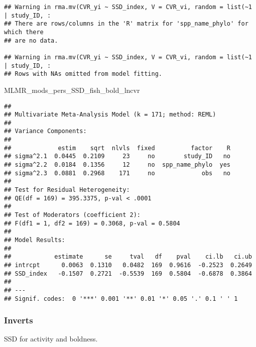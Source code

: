\documentclass[]{article}
\newenvironment{Shaded}{\begin{snugshade}}{\end{snugshade}}
\newcommand{\NormalTok}[1]{#1}
\begin{document}
\begin{verbatim}
## Warning in rma.mv(CVR_yi ~ SSD_index, V = CVR_vi, random = list(~1 | study_ID, :
## There are rows/columns in the 'R' matrix for 'spp_name_phylo' for which there
## are no data.

## Warning in rma.mv(CVR_yi ~ SSD_index, V = CVR_vi, random = list(~1 | study_ID, :
## Rows with NAs omitted from model fitting.
\end{verbatim}

\begin{Shaded}
\begin{Highlighting}[]
\NormalTok{    MLMR_mods_pers_SSD_fish_bold_lncvr}
\end{Highlighting}
\end{Shaded}

\begin{verbatim}
## 
## Multivariate Meta-Analysis Model (k = 171; method: REML)
## 
## Variance Components:
## 
##             estim    sqrt  nlvls  fixed          factor    R 
## sigma^2.1  0.0445  0.2109     23     no        study_ID   no 
## sigma^2.2  0.0184  0.1356     12     no  spp_name_phylo  yes 
## sigma^2.3  0.0881  0.2968    171     no             obs   no 
## 
## Test for Residual Heterogeneity:
## QE(df = 169) = 395.3375, p-val < .0001
## 
## Test of Moderators (coefficient 2):
## F(df1 = 1, df2 = 169) = 0.3068, p-val = 0.5804
## 
## Model Results:
## 
##            estimate      se     tval   df    pval    ci.lb   ci.ub 
## intrcpt      0.0063  0.1310   0.0482  169  0.9616  -0.2523  0.2649    
## SSD_index   -0.1507  0.2721  -0.5539  169  0.5804  -0.6878  0.3864    
## 
## ---
## Signif. codes:  0 '***' 0.001 '**' 0.01 '*' 0.05 '.' 0.1 ' ' 1
\end{verbatim}

\subsubsection{Inverts}\label{inverts}

SSD for activity and boldness.
\end{document}
